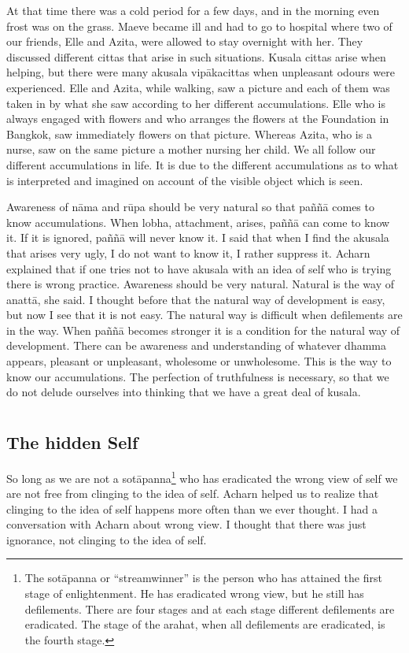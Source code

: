 At that time there was a cold period for a few days, and in the morning
even frost was on the grass. Maeve became ill and had to go to hospital
where two of our friends, Elle and Azita, were allowed to stay overnight
with her. They discussed different cittas that arise in such situations.
Kusala cittas arise when helping, but there were many akusala
vipākacittas when unpleasant odours were experienced. Elle and Azita,
while walking, saw a picture and each of them was taken in by what she
saw according to her different accumulations. Elle who is always engaged
with flowers and who arranges the flowers at the Foundation in Bangkok,
saw immediately flowers on that picture. Whereas Azita, who is a nurse,
saw on the same picture a mother nursing her child. We all follow our
different accumulations in life. It is due to the different
accumulations as to what is interpreted and imagined on account of the
visible object which is seen.

Awareness of nāma and rūpa should be very natural so that paññā comes to
know accumulations. When lobha, attachment, arises, paññā can come to
know it. If it is ignored, paññā will never know it. I said that when I
find the akusala that arises very ugly, I do not want to know it, I
rather suppress it. Acharn explained that if one tries not to have
akusala with an idea of self who is trying there is wrong practice.
Awareness should be very natural. Natural is the way of anattā, she
said. I thought before that the natural way of development is easy, but
now I see that it is not easy. The natural way is difficult when
defilements are in the way. When paññā becomes stronger it is a
condition for the natural way of development. There can be awareness and
understanding of whatever dhamma appears, pleasant or unpleasant,
wholesome or unwholesome. This is the way to know our accumulations. The
perfection of truthfulness is necessary, so that we do not delude
ourselves into thinking that we have a great deal of kusala.




\chapter[The hidden Self]{}
\section*{The hidden Self}

So long as we are not a sotāpanna\footnote{The sotāpanna or
``streamwinner'' is the person who has attained the first stage of
enlightenment. He has eradicated wrong view, but he still has
defilements. There are four stages and at each stage different
defilements are eradicated. The stage of the arahat, when all
defilements are eradicated, is the fourth stage.} who has eradicated the
wrong view of self we are not free from clinging to the idea of self.
Acharn helped us to realize that clinging to the idea of self happens
more often than we ever thought. I had a conversation with Acharn about
wrong view. I thought that there was just ignorance, not clinging to the
idea of self.

